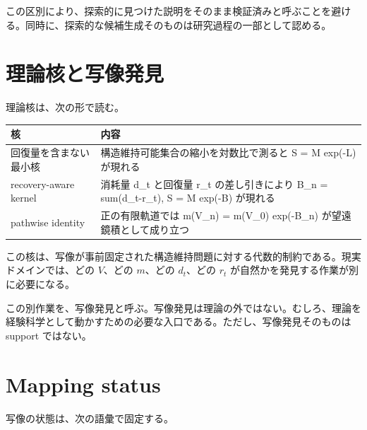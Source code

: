 \documentclass[12pt,a4paper]{article}
\begin{document}
この区別により、探索的に見つけた説明をそのまま検証済みと呼ぶことを避ける。同時に、探索的な候補生成そのものは研究過程の一部として認める。

\section{理論核と写像発見}\label{ux7406ux8ad6ux6838ux3068ux5199ux50cfux767aux898b}

理論核は、次の形で読む。

{\def\LTcaptype{table} %
\begin{longtable}[]{@{}
  >{\raggedright\arraybackslash}p{}
  >{\raggedright\arraybackslash}p{}@{}}
\toprule\noalign{}
\begin{minipage}[b]{\linewidth}\raggedright
核
\end{minipage} & \begin{minipage}[b]{\linewidth}\raggedright
内容
\end{minipage} \\
\midrule\noalign{}
\endhead
\bottomrule\noalign{}
\endlastfoot
回復量を含まない最小核 & 構造維持可能集合の縮小を対数比で測ると S = M exp(-L) が現れる \\
recovery-aware kernel & 消耗量 d\_t と回復量 r\_t の差し引きにより B\_n = sum(d\_t-r\_t), S = M exp(-B) が現れる \\
pathwise identity & 正の有限軌道では m(V\_n) = m(V\_0) exp(-B\_n) が望遠鏡積として成り立つ \\
\end{longtable}
}

この核は、写像が事前固定された構造維持問題に対する代数的制約である。現実ドメインでは、どの \(V\)、どの \(m\)、どの \(d_{t}\)、どの \(r_{t}\) が自然かを発見する作業が別に必要になる。

この別作業を、写像発見と呼ぶ。写像発見は理論の外ではない。むしろ、理論を経験科学として動かすための必要な入口である。ただし、写像発見そのものは support ではない。

\section{Mapping status}\label{mapping-status}

写像の状態は、次の語彙で固定する。
\end{document}
